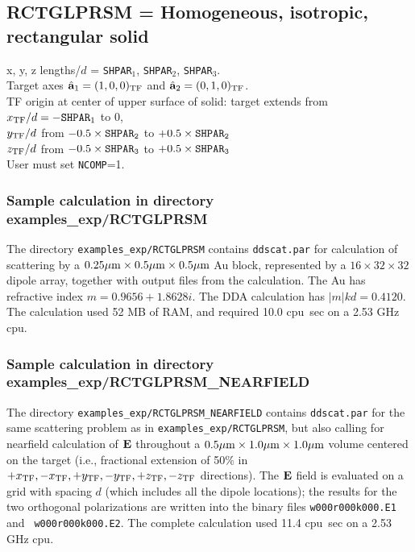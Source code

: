 \subsection{ RCTGLPRSM = Homogeneous, isotropic, rectangular solid
            \label{sec:RCTGLPRSM}}
	x, y, z lengths/$d$ = {\tt SHPAR$_1$}, {\tt SHPAR$_2$}, 
        {\tt SHPAR}$_3$.\\
	Target axes ${\hat{\bf a}}_1=(1,0,0)_{\rm TF}$ 
	and ${\hat{\bf a}}_2=(0,1,0)_{\rm TF}$.\\
	TF origin at center of upper surface of solid:
	target extends from $x_{\rm TF}/d=-{\tt SHPAR}_1$ to 0,\\
	$y_{\rm TF}/d$ from $-0.5\times{\tt SHPAR_2}$ to $+0.5\times{\tt SHPAR_2}$\\
	$z_{\rm TF}/d$ from $-0.5\times{\tt SHPAR_3}$ to $+0.5\times{\tt SHPAR_3}$\\
	User must set {\tt NCOMP}=1.

\subsubsection{\label{sec:example RCTGLPRSM}
               \bf Sample calculation in directory examples\_exp/RCTGLPRSM}
The directory {\tt examples\_exp/RCTGLPRSM} contains {\tt ddscat.par} for
 calculation
of scattering by a $0.25{\mu{\rm m}}\times0.5{\mu{\rm m}}\times0.5{\mu{\rm m}}$ Au block,
represented by a $16\times32\times32$ dipole array, together with output
files from the calculation.
The Au has refractive index $m=0.9656+1.8628i$.
The DDA calculation has $|m|kd=0.4120$.
The calculation used 52 MB of RAM, and required 10.0 cpu~sec on a 2.53 GHz
cpu.

\subsubsection{\label{sec:example RCTGLPRSM_NEARFIELD}
               \bf Sample calculation in directory
               examples\_exp/RCTGLPRSM\_NEARFIELD} 

The directory {\tt examples\_exp/RCTGLPRSM\_NEARFIELD} contains 
{\tt ddscat.par} for the same scattering problem as in 
{\tt examples\_exp/RCTGLPRSM}, but also calling for nearfield calculation
of ${\bf E}$ throughout a $0.5{\mu{\rm m}}\times1.0{\mu{\rm m}}\times1.0{\mu{\rm m}}$
volume centered on the target (i.e., fractional extension of 50\% in
$+x_{\rm TF},-x_{\rm TF},+y_{\rm TF},-y_{\rm TF},+z_{\rm TF},-z_{\rm TF}$ directions).  The ${\bf E}$
field is evaluated on a grid with spacing $d$ (which includes all the
dipole locations); the results for the two orthogonal polarizations
are written into the binary files {\tt w000r000k000.E1} and {\tt
  w000r000k000.E2}.  The complete calculation used 11.4 cpu~sec on a
2.53 GHz cpu.

